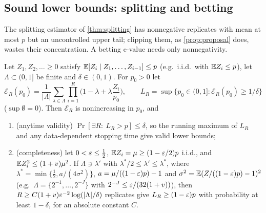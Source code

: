 \begin{table}[htbp]
\centering\scriptsize\setlength{\tabcolsep}{4pt}

\caption{Failure sets of suite nets ($F$ failing inputs). $W_1$: level-1 Fourier weight
as a fraction of $\mathrm{Var}f$; $\overline{|\bar x_i|}$: mean over coordinates of the
absolute mean failing input; halfspace $K$: mass of the best halfspace containing all
failures, over $p$; minima: single-flip local minima of $f$ among failures; clusters:
connected components under single flips (\texttt{nets\_structure/structure.py},
\texttt{nets\_analytic/barrier\_table.py}).}
\label{tab:nets-structure}
\end{table}

\subsection{Sound lower bounds: splitting and betting}\label{sec:nets-lower}

The splitting estimator of \cref{thm:splitting} has nonnegative replicates with mean
at most $p$ but an uncontrolled upper tail; clipping them, as \cref{prop:proposal}
does, wastes their concentration. A betting e-value
\cite{waudbysmith2024} needs only nonnegativity.

\begin{proposition}\label{prop:betting}
Let $Z_1,Z_2,\dots\ge0$ satisfy $\mathbb{E}[Z_i\mid Z_1,\dots,Z_{i-1}]\le p$ (e.g.\ i.i.d.\ with
$\mathbb{E} Z_i\le p$), let $\Lambda\subset(0,1]$ be finite and $\delta\in(0,1)$. For $p_0>0$ let
\[
\mathcal E_R(p_0)=\frac1{|\Lambda|}\sum_{\lambda\in\Lambda}\prod_{i=1}^R\Big(1-\lambda+\lambda\frac{Z_i}{p_0}\Big),
\qquad L_R=\sup\{p_0\in(0,1]:\mathcal E_R(p_0)\ge1/\delta\}
\]
($\sup\emptyset=0$). Then $\mathcal E_R$ is nonincreasing in $p_0$, and
\begin{enumerate}[label=(\alph*)]
\item (anytime validity) $\Pr[\exists R:\ L_R>p]\le\delta$, so the running maximum of $L_R$
and any data-dependent stopping time give valid lower bounds;
\item (completeness) let $0<\varepsilon\le\frac12$, $\mathbb{E} Z_i=\mu\ge(1-\varepsilon/2)p$ i.i.d., and
$\mathbb{E} Z_i^2\le(1+v)\mu^2$. If $\Lambda\ni\lambda'$ with $\lambda^*/2\le\lambda'\le\lambda^*$, where
$\lambda^*=\min\{\frac12,a/(4\sigma^2)\}$, $a=\mu/((1-\varepsilon)p)-1$ and
$\sigma^2=\mathbb{E}(Z/((1-\varepsilon)p)-1)^2$ (e.g.\ $\Lambda=\{2^{-1},\dots,2^{-J}\}$ with
$2^{-J}\le\varepsilon/(32(1+v))$), then $R\ge C(1+v)\varepsilon^{-2}\log(|\Lambda|/\delta)$
replicates give $L_R\ge(1-\varepsilon)p$ with probability at least $1-\delta$, for an absolute
constant $C$.
\end{enumerate}
\end{proposition}

